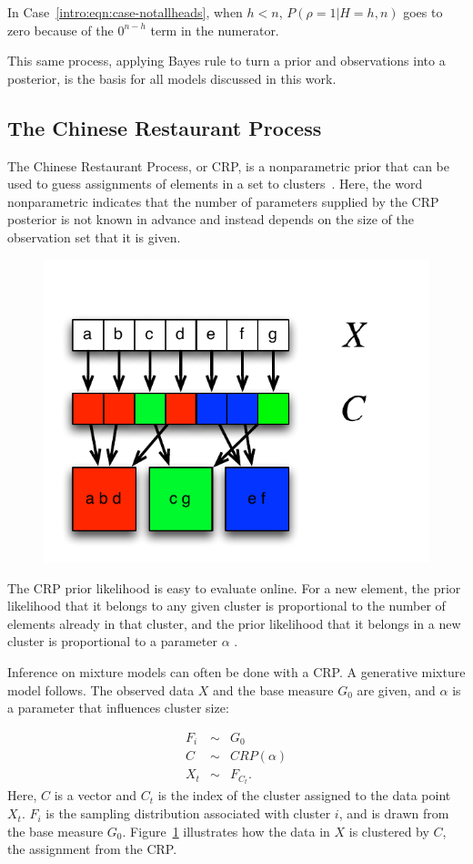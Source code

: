 In Case~\ref{intro:eqn:case-notallheads}, when $h<n$, $P(\rho=1|H=h,n)$ goes to zero because of the $0^{n-h}$ term in the numerator.

This same process, applying Bayes rule to turn a prior and observations into a posterior, is the basis for all models discussed in this work.

\subsection{The Chinese Restaurant Process}

The Chinese Restaurant Process, or CRP, is a nonparametric prior that can be used to guess assignments of elements in a set to clusters~\cite{teh2010dirichlet}. Here, the word nonparametric indicates that the number of parameters supplied by the CRP posterior is not known in advance and instead depends on the size of the observation set that it is given.

\begin{figure}[t]
\begin{center}
\includegraphics[width=0.4\linewidth]{crp-mixture.pdf}
\caption{}
\label{intro:crp-mixture}
\end{center}
\end{figure}


The CRP prior likelihood is easy to evaluate online. For a new element, the prior likelihood that it belongs to any given cluster is proportional to the number of elements already in that cluster, and the prior likelihood that it belongs in a new cluster is proportional to a parameter $\alpha$ .

Inference on mixture models can often be done with a CRP. A generative mixture model follows. The observed data $X$ and the base measure $G_0$ are given, and $\alpha$ is a parameter that influences cluster size:

\begin{eqnarray}
F_i&\sim&G_0\\
C&\sim&CRP(\alpha)\\
X_t&\sim&F_{C_t}.
\end{eqnarray}
Here, $C$ is a vector and $C_t$ is the index of the cluster assigned to the data point $X_t$. $F_i$ is the sampling distribution associated with cluster $i$, and is drawn from the base measure $G_0$. Figure~\ref{intro:crp-mixture} illustrates how the data in $X$ is clustered by $C$, the assignment from the CRP.

